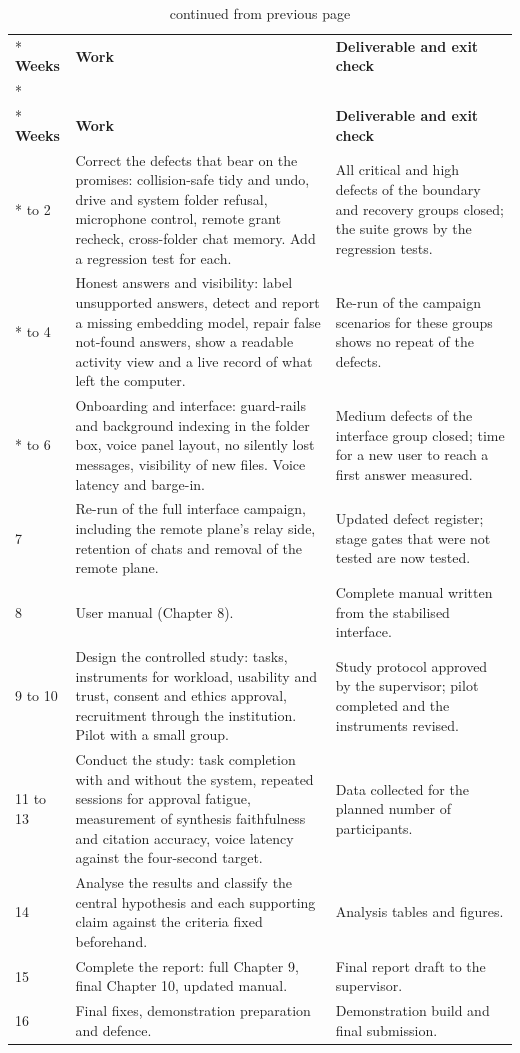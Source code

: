 \documentclass{FastFyp}
\begin{document}
{\small
{}
\begin{longtable}{|p{1.4cm}|p{7.0cm}|p{5.8cm}|}
\caption{Plan of work for the second phase.}\label{tab:plan}\\*
\hline
\textbf{Weeks} & \textbf{Work} & \textbf{Deliverable and exit check} \\*
\hline
\endfirsthead
\caption[]{continued from previous page}\\*
\hline
\textbf{Weeks} & \textbf{Work} & \textbf{Deliverable and exit check} \\*
\hline
\endhead
\hline
1 to 2 & Correct the defects that bear on the promises: collision-safe tidy and undo, drive and system folder refusal, microphone control, remote grant recheck, cross-folder chat memory. Add a regression test for each. & All critical and high defects of the boundary and recovery groups closed; the suite grows by the regression tests. \\*
\hline
3 to 4 & Honest answers and visibility: label unsupported answers, detect and report a missing embedding model, repair false not-found answers, show a readable activity view and a live record of what left the computer. & Re-run of the campaign scenarios for these groups shows no repeat of the defects. \\*
\hline
5 to 6 & Onboarding and interface: guard-rails and background indexing in the folder box, voice panel layout, no silently lost messages, visibility of new files. Voice latency and barge-in. & Medium defects of the interface group closed; time for a new user to reach a first answer measured. \\
\hline
7 & Re-run of the full interface campaign, including the remote plane's relay side, retention of chats and removal of the remote plane. & Updated defect register; stage gates that were not tested are now tested. \\
\hline
8 & User manual (Chapter 8). & Complete manual written from the stabilised interface. \\
\hline
9 to 10 & Design the controlled study: tasks, instruments for workload, usability and trust, consent and ethics approval, recruitment through the institution. Pilot with a small group. & Study protocol approved by the supervisor; pilot completed and the instruments revised. \\
\hline
11 to 13 & Conduct the study: task completion with and without the system, repeated sessions for approval fatigue, measurement of synthesis faithfulness and citation accuracy, voice latency against the four-second target. & Data collected for the planned number of participants. \\
\hline
14 & Analyse the results and classify the central hypothesis and each supporting claim against the criteria fixed beforehand. & Analysis tables and figures. \\
\hline
15 & Complete the report: full Chapter 9, final Chapter 10, updated manual. & Final report draft to the supervisor. \\
\hline
16 & Final fixes, demonstration preparation and defence. & Demonstration build and final submission. \\
\hline
\end{longtable}
}
\end{document}
